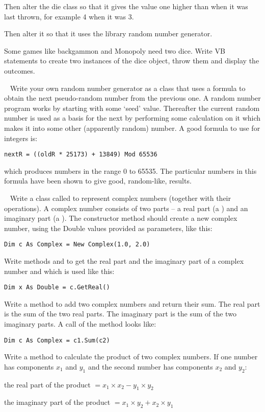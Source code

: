 \begin{EXE}
				Then alter the die class so that it gives the value one higher than when it was last thrown, for example 4 when it was 3.

				Then alter it so that it uses the library random number generator.

				Some games like backgammon and Monopoly need two dice. Write VB statements to create two instances of the dice object, throw them and display the outcomes.
			\item  Write your own random number generator as a class that uses a formula to obtain the next pseudo-random number from the previous one. A random number program works by starting with some ‘seed' value. Thereafter the current random number is used as a basis for the next by performing some calculation on it which makes it into some other (apparently random) number. A good formula to use for integers is:
				\begin{lstlisting}
nextR = ((oldR * 25173) + 13849) Mod 65536
				\end{lstlisting}
				which produces numbers in the range 0 to 65535. The particular numbers in this formula have been shown to give good, random-like, results.
			\item  Write a class called  to represent complex numbers (together with their operations). A complex number consists of two parts – a real part (a ) and an imaginary part (a ). The constructor method should create a new complex number, using the Double values provided as parameters, like this:
				\begin{lstlisting}
Dim c As Complex = New Complex(1.0, 2.0)
				\end{lstlisting}
				Write methods  and  to get the real part and the imaginary part of a complex number and which is used like this:
				\begin{lstlisting}
Dim x As Double = c.GetReal()
				\end{lstlisting}
				Write a method to add two complex numbers and return their sum. The real part is the sum of the two real parts. The imaginary part is the sum of the two imaginary parts. A call of the method looks like:
				\begin{lstlisting}
Dim c As Complex = c1.Sum(c2)
				\end{lstlisting}
				Write a method to calculate the product of two complex numbers. If one number has components $x_1$ and $y_1$ and the second number has components $x_2$ and $y_2$:
      \item the real part of the product $= x_1 × x_2 − y_1 × y_2$
      \item the imaginary part of the product $= x_1 × y_2 + x_2 × y_1$
		\end{EXE}

